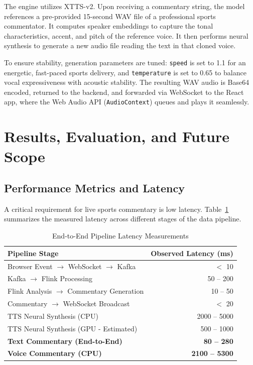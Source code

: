 \documentclass[12pt,a4paper]{article}
\begin{document}
The engine utilizes XTTS-v2. Upon receiving a commentary string, the model references a pre-provided 15-second WAV file of a professional sports commentator. It computes speaker embeddings to capture the tonal characteristics, accent, and pitch of the reference voice. It then performs neural synthesis to generate a new audio file reading the text in that cloned voice. 

To ensure stability, generation parameters are tuned: \texttt{speed} is set to 1.1 for an energetic, fast-paced sports delivery, and \texttt{temperature} is set to 0.65 to balance vocal expressiveness with acoustic stability. The resulting WAV audio is Base64 encoded, returned to the backend, and forwarded via WebSocket to the React app, where the Web Audio API (\texttt{AudioContext}) queues and plays it seamlessly.


\newpage
\section{Results, Evaluation, and Future Scope}

\subsection{Performance Metrics and Latency}

A critical requirement for live sports commentary is low latency. Table~\ref{tab:latency} summarizes the measured latency across different stages of the data pipeline.

\begin{table}[H]
\centering
\caption{End-to-End Pipeline Latency Measurements}
\label{tab:latency}
\begin{tabular}{@{}lr@{}}
\toprule
\textbf{Pipeline Stage} & \textbf{Observed Latency (ms)} \\
\midrule
Browser Event $\rightarrow$ WebSocket $\rightarrow$ Kafka & $<$ 10 \\
Kafka $\rightarrow$ Flink Processing & 50 -- 200 \\
Flink Analysis $\rightarrow$ Commentary Generation & 10 -- 50 \\
Commentary $\rightarrow$ WebSocket Broadcast & $<$ 20 \\
\midrule
TTS Neural Synthesis (CPU) & 2000 -- 5000 \\
TTS Neural Synthesis (GPU - Estimated) & 500 -- 1000 \\
\midrule
\textbf{Text Commentary (End-to-End)} & \textbf{80 -- 280} \\
\textbf{Voice Commentary (CPU)} & \textbf{2100 -- 5300} \\
\bottomrule
\end{tabular}
\end{table}
\end{document}
